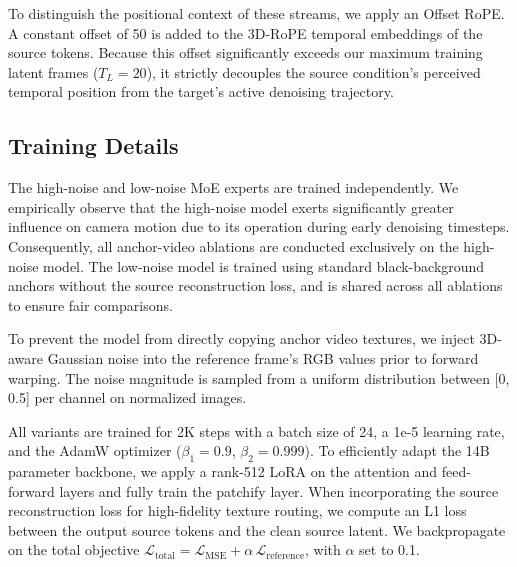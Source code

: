 To distinguish the positional context of these streams, we apply an Offset RoPE. A constant offset of 50 is added to the 3D-RoPE temporal embeddings of the source tokens. Because this offset significantly exceeds our maximum training latent frames ($T_L = 20$), it strictly decouples the source condition's perceived temporal position from the target's active denoising trajectory.



\subsection{Training Details}
\label{sec:training_details}

The high-noise and low-noise MoE experts are trained independently. We empirically observe that the high-noise model exerts significantly greater influence on camera motion due to its operation during early denoising timesteps. Consequently, all anchor-video ablations are conducted exclusively on the high-noise model. The low-noise model is trained using standard black-background anchors without the source reconstruction loss, and is shared across all ablations to ensure fair comparisons.

To prevent the model from directly copying anchor video textures, we inject 3D-aware Gaussian noise into the reference frame's RGB values prior to forward warping. The noise magnitude is sampled from a uniform distribution between [0, 0.5] per channel on normalized images.

All variants are trained for 2K steps with a batch size of 24, a 1e-5 learning rate, and the AdamW optimizer ($\beta_1=0.9$, $\beta_2=0.999$). To efficiently adapt the 14B parameter backbone, we apply a rank-512 LoRA on the attention and feed-forward layers and fully train the patchify layer. When incorporating the source reconstruction loss for high-fidelity texture routing, we compute an L1 loss between the output source tokens and the clean source latent. We backpropagate on the total objective $\mathcal{L}_{\text{total}} = \mathcal{L}_{\text{MSE}} + \alpha \,\mathcal{L}_{\text{reference}}$, with $\alpha$ set to 0.1.

